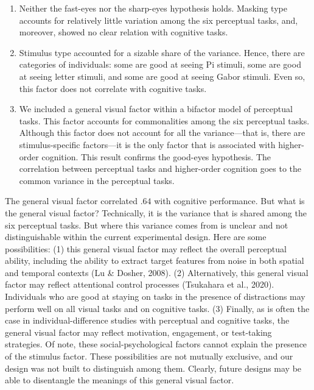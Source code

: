 \documentclass[
  ,man]{apa6}
\begin{document}
\begin{enumerate}
\def\labelenumi{\arabic{enumi}.}
\item
  Neither the fast-eyes nor the sharp-eyes hypothesis holds. Masking type accounts for relatively little variation among the six perceptual tasks, and, moreover, showed no clear relation with cognitive tasks.
\item
  Stimulus type accounted for a sizable share of the variance. Hence, there are categories of individuals: some are good at seeing Pi stimuli, some are good at seeing letter stimuli, and some are good at seeing Gabor stimuli. Even so, this factor does not correlate with cognitive tasks.
\item
  We included a general visual factor within a bifactor model of perceptual tasks. This factor accounts for commonalities among the six perceptual tasks. Although this factor does not account for all the variance---that is, there are stimulus-specific factors---it is the only factor that is associated with higher-order cognition. This result confirms the good-eyes hypothesis. The correlation between perceptual tasks and higher-order cognition goes to the common variance in the perceptual tasks.
\end{enumerate}

The general visual factor correlated \(.64\) with cognitive performance. But what is the general visual factor? Technically, it is the variance that is shared among the six perceptual tasks. But where this variance comes from is unclear and not distinguishable within the current experimental design. Here are some possibilities: (1) this general visual factor may reflect the overall perceptual ability, including the ability to extract target features from noise in both spatial and temporal contexts (Lu \& Dosher, 2008). (2) Alternatively, this general visual factor may reflect attentional control processes (Tsukahara et al., 2020). Individuals who are good at staying on tasks in the presence of distractions may perform well on all visual tasks and on cognitive tasks. (3) Finally, as is often the case in individual-difference studies with perceptual and cognitive tasks, the general visual factor may reflect motivation, engagement, or test-taking strategies. Of note, these social-psychological factors cannot explain the presence of the stimulus factor. These possibilities are not mutually exclusive, and our design was not built to distinguish among them. Clearly, future designs may be able to disentangle the meanings of this general visual factor.
\end{document}
